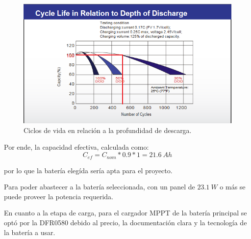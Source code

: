 \begin{figure}[H]
	\centering
	\includegraphics[width=0.9\linewidth]{ImagenesFactibilidad/UL24-12_Cdod}	
	\caption{Ciclos de vida en relación a la profundidad de descarga.}
	\label{fig:cdod}
\end{figure}

Por ende, la capacidad efectiva, calculada como:
\begin{equation}
C_{ef} = C_{nom}*0.9*1 = 21.6 \ Ah
\end{equation}

por lo que la batería elegída sería apta para el proyecto.


Para poder abastecer a la batería seleccionada, con un panel de $23.1 \ W$ o más se puede proveer la potencia requerida.

En cuanto a la etapa de carga, para el cargador MPPT de la batería principal se optó por la DFR0580 debido al precio, la documentación clara y la tecnología de la batería a usar.
